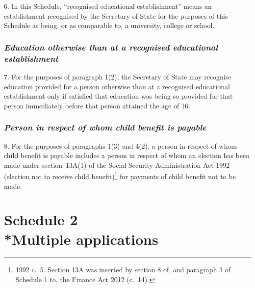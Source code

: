 \documentclass[a4paper,12pt]{article}
\begin{document}
6.  In this Schedule, “recognised educational establishment” means an establishment recognised by the Secretary of State for the purposes of this Schedule as being, or as comparable to, a university, college or school.


\section*{\itshape Education otherwise than at a recognised educational establishment}

7.  For the purposes of paragraph 1(2), the Secretary of State may recognise education provided for a person otherwise than at a recognised educational establishment only if satisfied that education was being so provided for that person immediately before that person attained the age of 16.


\section*{\itshape Person in respect of whom child benefit is payable}

8.  For the purposes of paragraphs 1(3) and 4(2), a person in respect of whom child benefit is payable includes a person in respect of whom an election has been made under section~13A(1) of the Social Security Administration Act 1992 (election not to receive child benefit)\footnote{1992 c.~5. Section 13A was inserted by section 8 of, and paragraph 3 of Schedule 1 to, the Finance Act 2012 (c.~14).} for payments of child benefit not to be made.


\vfill

\part[Schedule 2 --- Multiple applications]{Schedule 2\\*Multiple applications}
\end{document}
